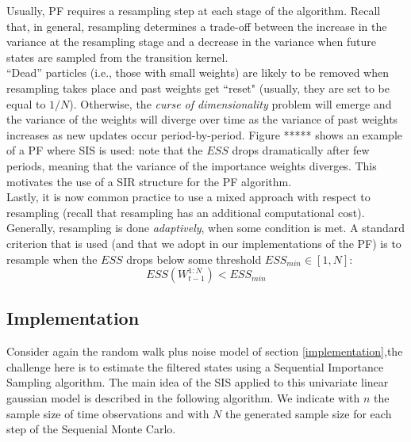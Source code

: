 \documentclass[
]{book}
\theoremstyle{break}
\theoremstyle{nonumberplain}
\begin{document}
Usually, PF requires a resampling step at each stage of the algorithm.
Recall that, in general, resampling determines a trade-off between the
increase in the variance at the resampling stage and a decrease in the
variance when future states are sampled from the transition kernel.\\
``Dead'' particles (i.e., those with small weights) are likely to be
removed when resampling takes place and past weights get ``reset"
(usually, they are set to be equal to \(1/N\)). Otherwise, the
\textit{curse of dimensionality} problem will emerge and the variance of
the weights will diverge over time as the variance of past weights
increases as new updates occur period-by-period. Figure ***** shows an
example of a PF where SIS is used: note that the \(ESS\) drops
dramatically after few periods, meaning that the variance of the
importance weights diverges. This motivates the use of a SIR structure
for the PF algorithm.~\\
Lastly, it is now common practice to use a mixed approach with respect
to resampling (recall that resampling has an additional computational
cost). Generally, resampling is done \textit{adaptively}, when some
condition is met. A standard criterion that is used (and that we adopt
in our implementations of the PF) is to resample when the \(ESS\) drops
below some threshold \(ESS_{min}\in [1,N]\): \begin{equation}
    ESS(W_{t-1}^{1:N})<ESS_{min}
\end{equation}

\subsection{Implementation}

Consider again the random walk plus noise model of section
\ref{implementation},the challenge here is to estimate the filtered
states using a Sequential Importance Sampling algorithm. The main idea
of the SIS applied to this univariate linear gaussian model is described
in the following algorithm. We indicate with \(n\) the sample size of
time observations and with \(N\) the generated sample size for each step
of the Sequenial Monte Carlo.
\end{document}
